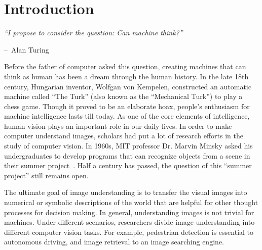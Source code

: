 \chapter{Introduction}
\label{chap:intro}

\makeatletter
\newenvironment{chapquote}[2][2em]
{\setlength{\@tempdima}{#1} \def\chapquote@author{#2} \parshape 1
  \@tempdima \dimexpr\textwidth-2\@tempdima\relax \itshape}
{\par\normalfont\hfill--\
\chapquote@author\hspace*{\@tempdima}\par\bigskip}
\makeatother

\begin{chapquote}{Alan Turing}
  ``I propose to consider the question: Can machine think?''
\end{chapquote}

Before the father of computer asked this question, creating
machines that can think as human has been a dream through the human
history. In the late 18th century, Hungarian inventor, Wolfgan von
Kempelen, constructed an automatic machine called ``The Turk'' (also
known as the ``Mechanical Turk'') to play a chess game. Though it
proved to be an elaborate hoax, people's enthusiasm for machine
intelligence lasts till today. As one of the core elements of
intelligence, human vision plays an important role in our daily lives.
In order to make computer understand images, scholars had put a lot of
research efforts in the study of computer vision. In 1960s, MIT
professor Dr. Marvin Minsky asked his undergraduates to develop
programs that can recognize objects from a scene in their summer
project~\cite{boden2006mind}. Half a century has passed, the question
of this ``summer project'' still remains open.

The ultimate goal of image understanding is to transfer the visual
images into numerical or symbolic descriptions of the world
that are helpful for other thought processes for decision making.
In general, understanding images is not trivial for machines.
Under different scenarios, researchers divide image
understanding into different computer vision tasks. For example,
pedestrian detection is essential to autonomous driving, and image
retrieval to an image searching engine.

